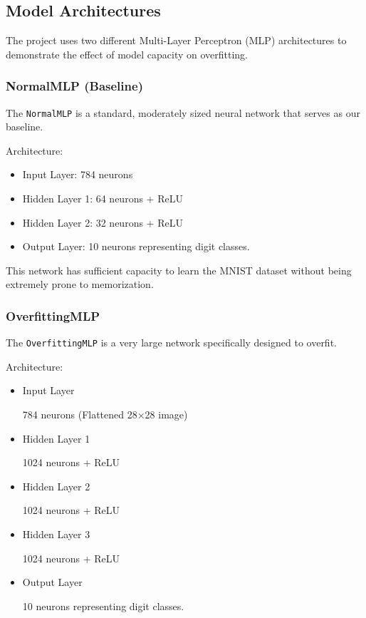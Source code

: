 \documentclass[12pt]{article}
\begin{document}

\subsection{Model Architectures}

The project uses two different Multi-Layer Perceptron (MLP) architectures to demonstrate the effect of model capacity on overfitting.

\subsubsection{NormalMLP (Baseline)}

The \texttt{NormalMLP} is a standard, moderately sized neural network that serves as our baseline.

Architecture:

\begin{itemize}
\item Input Layer: 784 neurons
\item Hidden Layer 1: 64 neurons + ReLU
\item Hidden Layer 2: 32 neurons + ReLU
\item Output Layer: 10 neurons representing digit classes.
\end{itemize}

This network has sufficient capacity to learn the MNIST dataset without being extremely prone to memorization.

\subsubsection{OverfittingMLP}

The \texttt{OverfittingMLP} is a very large network specifically designed to overfit.

Architecture:

\begin{itemize}

\item Input Layer

784 neurons (Flattened 28×28 image)

\item Hidden Layer 1

1024 neurons + ReLU

\item Hidden Layer 2

1024 neurons + ReLU

\item Hidden Layer 3

1024 neurons + ReLU

\item Output Layer

10 neurons representing digit classes.

\end{itemize}
\end{document}
